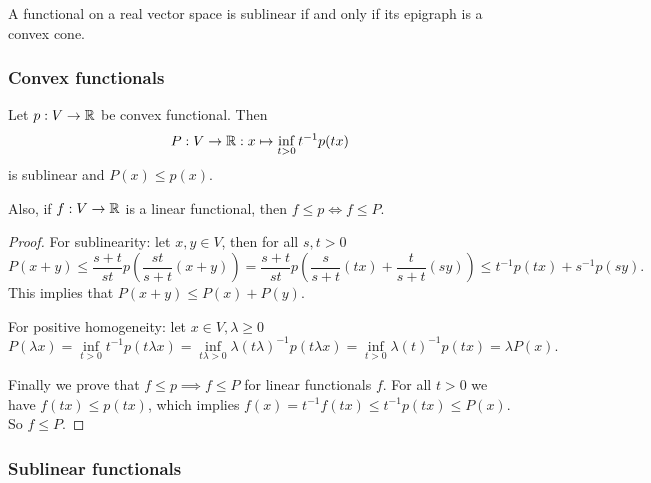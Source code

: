 \begin{corollary}
A functional on a real vector space is sublinear \textup{if and only if} its epigraph is a convex cone.
\end{corollary}

\subsubsection{Convex functionals}

\begin{proposition}
Let $p: V\to\mathbb{R}$ be convex functional. Then
\[ P: V\to\mathbb{R}: x\mapsto \inf_{t>0} t^{-1}p(tx) \]
is sublinear and $P(x)\leq p(x)$.

Also, if $f:V\to \mathbb{R}$ is a linear functional, then $f\leq p \iff f\leq P$.
\end{proposition}
\begin{proof}
For sublinearity: let $x,y\in V$, then for all $s,t>0$
\[ P(x+y) \leq \frac{s+t}{st}p\left(\frac{st}{s+t}(x+y)\right) = \frac{s+t}{st}p\left(\frac{s}{s+t}(tx)+\frac{t}{s+t}(sy)\right) \leq t^{-1}p(tx) + s^{-1}p(sy). \]
This implies that $P(x+y)\leq P(x)+P(y)$.

For positive homogeneity: let $x\in V,\lambda\geq 0$
\[ P(\lambda x) = \inf_{t>0} t^{-1}p(t\lambda x) = \inf_{t\lambda>0} \lambda (t\lambda)^{-1}p(t\lambda x) = \inf_{t>0} \lambda (t)^{-1}p(tx) = \lambda P(x). \]

Finally we prove that $f\leq p \implies f\leq P$ for linear functionals $f$. For all $t>0$ we have $f(tx) \leq p(tx)$, which implies $f(x) = t^{-1}f(tx) \leq t^{-1}p(tx) \leq P(x)$. So $f\leq P$.
\end{proof}

\subsubsection{Sublinear functionals}

